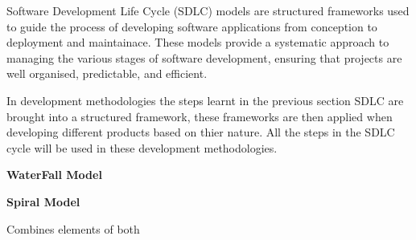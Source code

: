 \documentclass[a4paper]{article}
\begin{document}
Software Development Life Cycle (SDLC) models are structured frameworks used to guide the process of developing software applications from conception
to deployment and maintainace. These models provide a systematic approach to managing the various stages of software development, ensuring that 
projects are well organised, predictable, and efficient.

In development methodologies the steps learnt in the previous section SDLC are brought into a structured framework, these frameworks are then applied
when developing different products based on thier nature. All the steps in the SDLC cycle will be used in these development methodologies.

\textbf{WaterFall Model}

\textbf{Spiral Model}

Combines elements of both 

\textbf{}
\end{document}
